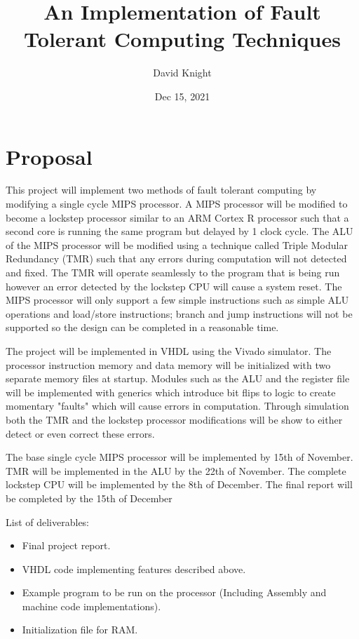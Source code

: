 \documentclass[12pt]{article}
\title{
    An Implementation of Fault Tolerant Computing Techniques\\
}
\author{
    David Knight\\
}
\date{Dec 15, 2021}
\begin{document}
\maketitle

\begin{center}

\tableofcontents

\end{center}

\pagebreak

\section{Proposal}
This project will implement two methods of fault tolerant computing by modifying a single cycle MIPS processor. A MIPS processor will be modified to become a lockstep processor similar to an ARM Cortex R processor such that a second core is running the same program but delayed by 1 clock cycle. The ALU of the MIPS processor will be modified using a technique called Triple Modular Redundancy (TMR) such that any errors during computation will not detected and fixed. The TMR will operate seamlessly to the program that is being run however an error detected by the lockstep CPU will cause a system reset. The MIPS processor will only support a few simple instructions such as simple ALU operations and load/store instructions; branch and jump instructions will not be supported so the design can be completed in a reasonable time.

The project will be implemented in VHDL using the Vivado simulator. The processor instruction memory and data memory will be initialized with two separate memory files at startup. Modules such as the ALU and the register file will be implemented with generics which introduce bit flips to logic to create momentary "faults" which will cause errors in computation. Through simulation both the TMR and the lockstep processor modifications will be show to either detect or even correct these errors.

The base single cycle MIPS processor will be implemented by 15th of November. TMR will be implemented in the ALU by the 22th of November. The complete lockstep CPU will be implemented by the 8th of December. The final report will be completed by the 15th of December

List of deliverables:
\begin{itemize}
    \item Final project report.
    \item VHDL code implementing features described above.
    \item Example program to be run on the processor (Including Assembly and machine code implementations).
    \item Initialization file for RAM.
\end{itemize}
\end{document}
